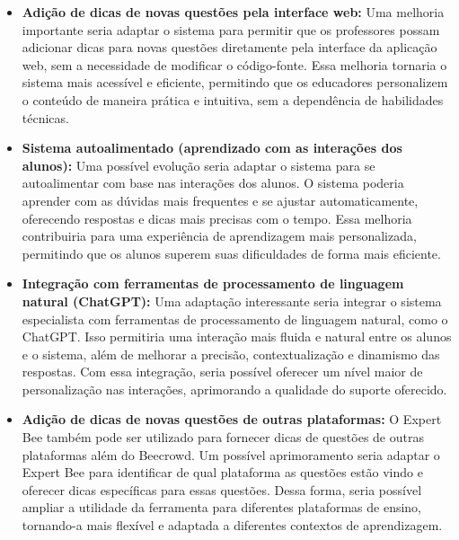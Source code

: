 \begin{itemize}
    \item  \textbf{Adição de dicas de novas questões pela interface web:} Uma melhoria importante seria adaptar o sistema para permitir que os professores possam adicionar dicas para novas questões diretamente pela interface da aplicação web, sem a necessidade de modificar o código-fonte. Essa melhoria tornaria o sistema mais acessível e eficiente, permitindo que os educadores personalizem o conteúdo de maneira prática e intuitiva, sem a dependência de habilidades técnicas.
    \item  \textbf{Sistema autoalimentado (aprendizado com as interações dos alunos):} Uma possível evolução seria adaptar o sistema para se autoalimentar com base nas interações dos alunos. O sistema poderia aprender com as dúvidas mais frequentes e se ajustar automaticamente, oferecendo respostas e dicas mais precisas com o tempo. Essa melhoria contribuiria para uma experiência de aprendizagem mais personalizada, permitindo que os alunos superem suas dificuldades de forma mais eficiente.
    \item  \textbf{Integração com ferramentas de processamento de linguagem natural (ChatGPT):} Uma adaptação interessante seria integrar o sistema especialista com ferramentas de processamento de linguagem natural, como o ChatGPT. Isso permitiria uma interação mais fluida e natural entre os alunos e o sistema, além de melhorar a precisão, contextualização e dinamismo das respostas. Com essa integração, seria possível oferecer um nível maior de personalização nas interações, aprimorando a qualidade do suporte oferecido.
    \item  \textbf{Adição de dicas de novas questões de outras plataformas:} O Expert Bee também pode ser utilizado para fornecer dicas de questões de outras plataformas além do Beecrowd. Um possível aprimoramento seria adaptar o Expert Bee para identificar de qual plataforma as questões estão vindo e oferecer dicas específicas para essas questões. Dessa forma, seria possível ampliar a utilidade da ferramenta para diferentes plataformas de ensino, tornando-a mais flexível e adaptada a diferentes contextos de aprendizagem.
\end{itemize}




